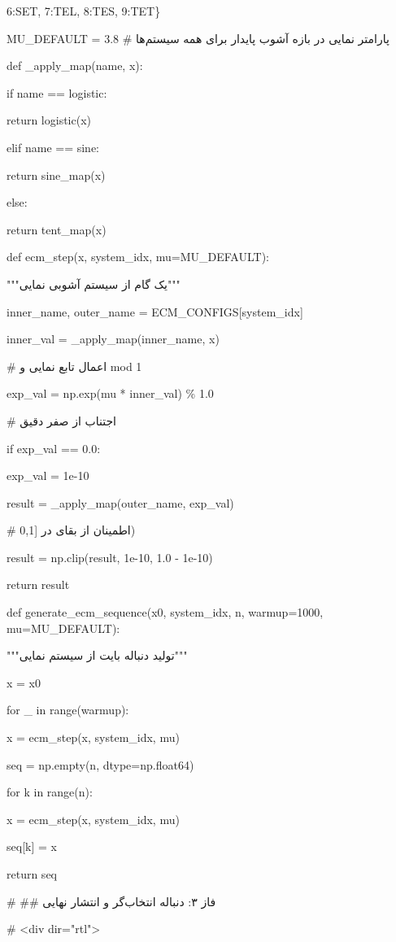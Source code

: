6:\textquotesingle SET\textquotesingle, 7:\textquotesingle TEL\textquotesingle, 8:\textquotesingle TES\textquotesingle, 9:\textquotesingle TET\textquotesingle\}

MU\_DEFAULT = 3.8 \# پارامتر نمایی در بازه آشوب پایدار برای همه سیستم‌ها

def \_apply\_map(name, x):

if name == \textquotesingle logistic\textquotesingle:

return logistic(x)

elif name == \textquotesingle sine\textquotesingle:

return sine\_map(x)

else:

return tent\_map(x)

def ecm\_step(x, system\_idx, mu=MU\_DEFAULT):

"""یک گام از سیستم آشوبی نمایی"""

inner\_name, outer\_name = ECM\_CONFIGS{[}system\_idx{]}

inner\_val = \_apply\_map(inner\_name, x)

\# اعمال تابع نمایی و mod 1

exp\_val = np.exp(mu * inner\_val) \% 1.0

\# اجتناب از صفر دقیق

if exp\_val == 0.0:

exp\_val = 1e-10

result = \_apply\_map(outer\_name, exp\_val)

\# اطمینان از بقای در {[}0,1)

result = np.clip(result, 1e-10, 1.0 - 1e-10)

return result

def generate\_ecm\_sequence(x0, system\_idx, n, warmup=1000, mu=MU\_DEFAULT):

"""تولید دنباله بایت از سیستم نمایی"""

x = x0

for \_ in range(warmup):

x = ecm\_step(x, system\_idx, mu)

seq = np.empty(n, dtype=np.float64)

for k in range(n):

x = ecm\_step(x, system\_idx, mu)

seq{[}k{]} = x

return seq

\# \#\# فاز ۳: دنباله انتخاب‌گر و انتشار نهایی

\# \textless div dir="rtl"\textgreater{}


